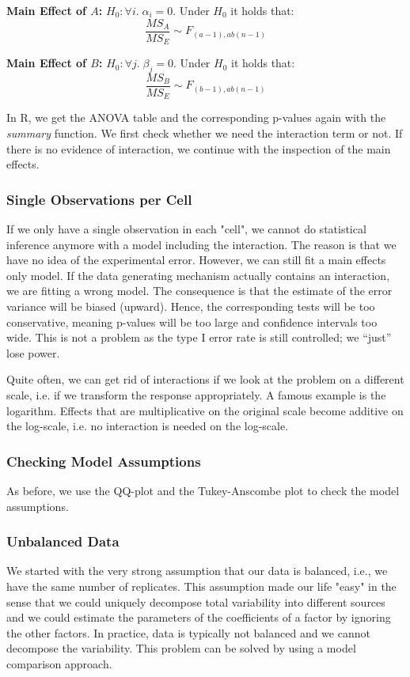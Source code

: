 \textbf{Main Effect of $A$:} $H_0: \forall i. \; \alpha_i = 0$. Under $H_0$ it holds that:
$$\frac{MS_{A}}{MS_E} \sim F_{(a-1), ab(n-1)}$$
 
\textbf{Main Effect of $B$:} $H_0: \forall j. \; \beta_j = 0$. Under $H_0$ it holds that:
$$\frac{MS_{B}}{MS_E} \sim F_{(b-1), ab(n-1)}$$

In R, we get the ANOVA table and the corresponding p-values again with the \textit{summary} function. We first check whether we need the interaction term or not. If there is no evidence of interaction, we continue with the inspection of the main effects.

\subsubsection{Single Observations per Cell}

If we only have a single observation in each "cell", we cannot do statistical inference anymore with a model including the interaction. The reason is that we have no idea of the experimental error. However, we can still fit a main effects only model. If the data generating mechanism actually contains an interaction, we are fitting a wrong model. The consequence is that the estimate of the error variance will be biased (upward). Hence, the corresponding tests will be too conservative, meaning p-values will be too large and confidence intervals too wide. This is not a problem as the type I error rate is still controlled; we “just” lose power. \medskip

Quite often, we can get rid of interactions if we look at the problem on a different scale, i.e. if we transform the response appropriately. A famous example is the logarithm. Effects that are multiplicative on the original scale become additive on the log-scale, i.e. no interaction is needed on the log-scale.

\subsubsection{Checking Model Assumptions}

As before, we use the QQ-plot and the Tukey-Anscombe plot to check the model assumptions.

\subsubsection{Unbalanced Data}

We started with the very strong assumption that our data is balanced, i.e., we have the same number of replicates. This assumption made our life "easy" in the sense that we could uniquely decompose total variability into different sources and we could estimate the parameters of the coefficients of a factor by ignoring the other factors. In practice, data is typically not balanced and we cannot decompose the variability. This problem can be solved by using a model comparison approach. \medskip

